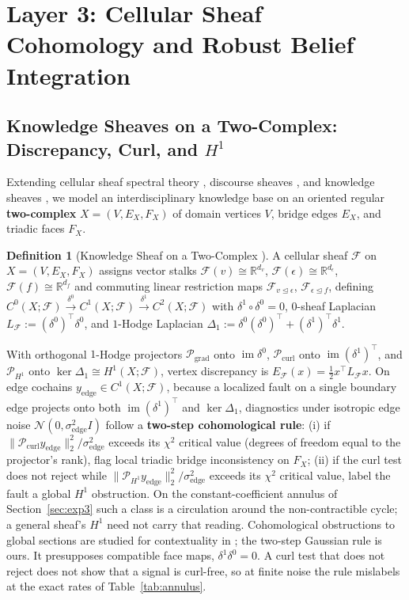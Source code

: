 \documentclass[11pt,a4paper]{article}
\theoremstyle{definition}
\newtheorem{definition}{Definition}
\theoremstyle{remark}
\newcommand{\R}{\mathbb{R}}
\newcommand{\im}{\operatorname{im}}
\newcommand{\Pgrad}{\mathcal{P}_{\mathrm{grad}}}
\newcommand{\Pcurl}{\mathcal{P}_{\mathrm{curl}}}
\newcommand{\Pharm}{\mathcal{P}_{H^1}}
\begin{document}
\section{Layer 3: Cellular Sheaf Cohomology and Robust Belief Integration}
\label{sec:sheaf}

\subsection{\texorpdfstring{Knowledge Sheaves on a Two-Complex: Discrepancy, Curl, and $H^1$}{Knowledge Sheaves on a Two-Complex: Discrepancy, Curl, and H1}}

Extending cellular sheaf spectral theory \cite{hansen2019toward}, discourse sheaves \cite{hansen2021opinion}, and knowledge sheaves \cite{gebhart2023knowledge}, we model an interdisciplinary knowledge base on an oriented regular \textbf{two-complex} $X = (V, E_X, F_X)$ of domain vertices $V$, bridge edges $E_X$, and triadic faces $F_X$.

\begin{definition}[Knowledge Sheaf on a Two-Complex \cite{hansen2019toward}]
A cellular sheaf $\mathcal{F}$ on $X = (V, E_X, F_X)$ assigns vector stalks $\mathcal{F}(v) \cong \R^{d_v}$, $\mathcal{F}(\epsilon) \cong \R^{d_\epsilon}$, $\mathcal{F}(f) \cong \R^{d_f}$ and commuting linear restriction maps $\mathcal{F}_{v \trianglelefteq \epsilon}$, $\mathcal{F}_{\epsilon \trianglelefteq f}$, defining $C^0(X;\mathcal{F}) \xrightarrow{\delta^0} C^1(X;\mathcal{F}) \xrightarrow{\delta^1} C^2(X;\mathcal{F})$ with $\delta^1 \circ \delta^0 = 0$, $0$-sheaf Laplacian $L_{\mathcal{F}} := (\delta^0)^\top \delta^0$, and $1$-Hodge Laplacian $\Delta_1 := \delta^0 (\delta^0)^\top + (\delta^1)^\top \delta^1$.
\end{definition}

With orthogonal $1$-Hodge projectors $\Pgrad$ onto $\im\delta^0$, $\Pcurl$ onto $\im(\delta^1)^\top$, and $\Pharm$ onto $\ker\Delta_1 \cong H^1(X;\mathcal{F})$, vertex discrepancy is $E_{\mathcal{F}}(x) = \frac{1}{2}x^\top L_{\mathcal{F}} x$. On edge cochains $y_{\mathrm{edge}} \in C^1(X;\mathcal{F})$, because a localized fault on a single boundary edge projects onto both $\im(\delta^1)^\top$ and $\ker\Delta_1$, diagnostics under isotropic edge noise $\mathcal{N}(0, \sigma_{\mathrm{edge}}^2 I)$ follow a \textbf{two-step cohomological rule}: (i) if $\|\Pcurl y_{\mathrm{edge}}\|_2^2 / \sigma_{\mathrm{edge}}^2$ exceeds its $\chi^2$ critical value (degrees of freedom equal to the projector's rank), flag local triadic bridge inconsistency on $F_X$; (ii) if the curl test does not reject while $\|\Pharm y_{\mathrm{edge}}\|_2^2 / \sigma_{\mathrm{edge}}^2$ exceeds its $\chi^2$ critical value, label the fault a global $H^1$ obstruction. On the constant-coefficient annulus of Section~\ref{sec:exp3} such a class is a circulation around the non-contractible cycle; a general sheaf's $H^1$ need not carry that reading. Cohomological obstructions to global sections are studied for contextuality in \cite{abramsky2011cohomology}; the two-step Gaussian rule is ours. It presupposes compatible face maps, $\delta^1\delta^0 = 0$. A curl test that does not reject does not show that a signal is curl-free, so at finite noise the rule mislabels at the exact rates of Table~\ref{tab:annulus}.
\end{document}
